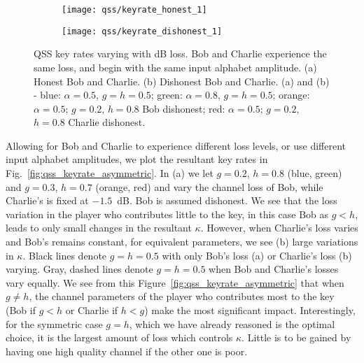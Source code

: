 \begin{figure}[htp]
\centering
	\begin{subfigure}{0.49\linewidth}
	\centering
	\texttt{[image: qss/keyrate\_honest\_1]}
	\caption{}
	\end{subfigure}
	\begin{subfigure}{0.49\linewidth}
	\centering
	\texttt{[image: qss/keyrate\_dishonest\_1]}
	\caption{}
	\end{subfigure}
\caption{\label{fig:qss_keyrate} QSS key rates varying with dB loss. Bob and Charlie experience the same loss, and begin with the same input alphabet amplitude. (a) Honest Bob and Charlie. (b) Dishonest Bob and Charlie. (a) and (b) - blue: $\alpha=0.5$, $g=h=0.5$; green: $\alpha = 0.8$, $g = h = 0.5$; orange: $\alpha = 0.5$; $g = 0.2$, $h=0.8$ Bob dishonest; red: $\alpha = 0.5$; $g=0.2$, $h=0.8$ Charlie dishonest.}
\end{figure}


Allowing for Bob and Charlie to experience different loss levels, or use different input alphabet amplitudes, we plot the resultant key rates in Fig.~\ref{fig:qss_keyrate_asymmetric}. In (a) we let $g=0.2$, $h=0.8$ (blue, green) and $g=0.3$, $h=0.7$ (orange, red) and vary the channel loss of Bob, while Charlie's is fixed at $-1.5$~dB. Bob is assumed dishonest. We see that the loss variation in the player who contributes little to the key, in this case Bob as $g < h$, leads to only small changes in the resultant $\kappa$. However, when Charlie's loss varies and Bob's remains constant, for equivalent parameters, we see (b) large variations in $\kappa$. Black lines denote $g=h=0.5$ with only Bob's loss (a) or Charlie's loss (b) varying. Gray, dashed lines denote $g=h=0.5$ when Bob and Charlie's losses vary equally. We see from this Figure~\ref{fig:qss_keyrate_asymmetric} that when $g \ne h$, the channel parameters of the player who contributes most to the key (Bob if $g < h$ or Charlie if $h < g$) make the most significant impact. Interestingly, for the symmetric case $g=h$, which we have already reasoned is the optimal choice, it is the largest amount of loss which controls $\kappa$. Little is to be gained by having one high quality channel if the other one is poor. 


